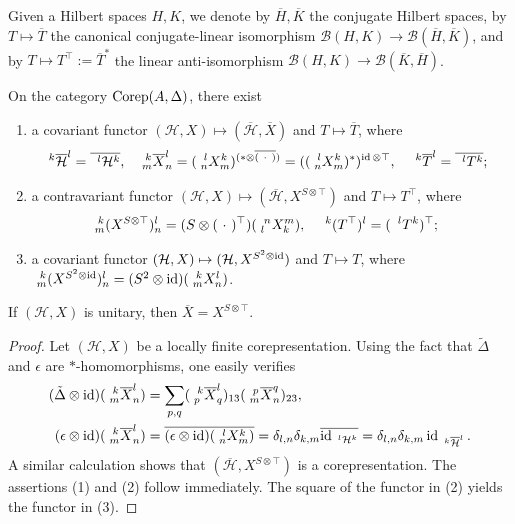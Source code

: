 Given a Hilbert spaces $H,K$, we denote by $\overline{H},\overline{K}$
the conjugate Hilbert spaces, by $T \mapsto \overline{T}$ the
canonical conjugate-linear isomorphism $\mathcal{B}(H,K) \to
\mathcal{B}(\overline{H},\overline{K})$, and by $T \mapsto
T^{\top}:=\overline{T}^{*}$ the linear anti-isomorphism
$\mathcal{B}(H,K) \to \mathcal{B}(\overline{K},\overline{H})$.

\begin{Lem} \label{lemma:rep-functors}
   On the category
  $\Corep(A,\Delta)$, there exist
  \begin{enumerate}
  \item a covariant functor $(\mathcal{H},X) \mapsto
    (\overline{\mathcal{H}},\overline{X})$ and $T \mapsto
    \overline{T}$, where
    \begin{align*}
      \Gru{\overline{\mathcal{H}}}{k}{l} &= \overline{\Gru{\mathcal{H}}{l}{k}},
      & \Gr{\overline{X}}{k}{l}{m}{n} &= (\Gr{X}{l}{k}{n}{m})^{(*
        \otimes \overline{(\ \cdot \ ) })}
      =((\Gr{X}{l}{k}{n}{m})^{*})^{\id \otimes \top}, &
      \Gru{\overline{T}}{k}{l} &= \overline{\Gru{T}{l}{k}};
    \end{align*}
  \item a contravariant functor $(\mathcal{H},X) \mapsto
    (\overline{\mathcal{H}},X^{S\otimes \top})$ and
    $T\mapsto T^{\top}$, where 
    \begin{align*}
      \Gr{(X^{S\otimes \top})}{k}{l}{m}{n} &= (S \otimes (\ \cdot \
      )^{\top})(\Gr{X}{n}{m}{l}{k}), & \Gru{(T^{\top})}{k}{l}
      &=(\Gru{T}{l}{k})^{\top};
    \end{align*}
  \item a covariant functor  $(\mathcal{H},X) \mapsto (\mathcal{H},X^{S^{2}\otimes \id})$
    and $T\mapsto T$, where $\Gr{(X^{S^{2}\otimes \id})}{k}{l}{m}{n}=(S^{2} \otimes
  \id)(\Gr{X}{k}{l}{m}{n})$.
  \end{enumerate}
  If $(\mathcal{H},X)$ is unitary, then $\overline{X}=X^{S\otimes \top}$.\end{Lem}
\begin{proof}
  Let $(\mathcal{H},X)$ be a locally finite corepresentation. Using the fact that $\tilde \Delta$ and $\epsilon$ are
  $*$-homomorphisms, one easily verifies
  \begin{align*}
    (\tilde \Delta \otimes \id)( \Gr{\overline{X}}{k}{l}{m}{n}) &=
    \sum_{p,q} ( \Gr{\overline{X}}{k}{l}{p}{q})_{13}
    ( \Gr{\overline{X}}{p}{q}{m}{n})_{23}, \\
    (\epsilon \otimes \id)(\Gr{\overline{X}}{k}{l}{m}{n}) &=
    \overline{(\epsilon \otimes \id)(\Gr{X}{l}{k}{n}{m})}
    = \delta_{l,n}\delta_{k,m}
    \overline{\id_{\Gru{\mathcal{H}}{l}{k}}}
    = \delta_{l,n}\delta_{k,m} \id_{\Gru{\overline{\mathcal{H}}}{k}{l}}.
  \end{align*}
  A similar calculation shows that
  $(\overline{\mathcal{H}},X^{S\otimes \top})$ is a
  corepresentation. The assertions (1) and (2) follow
  immediately. The square of the functor in (2) yields the functor in
  (3).  
\end{proof}
